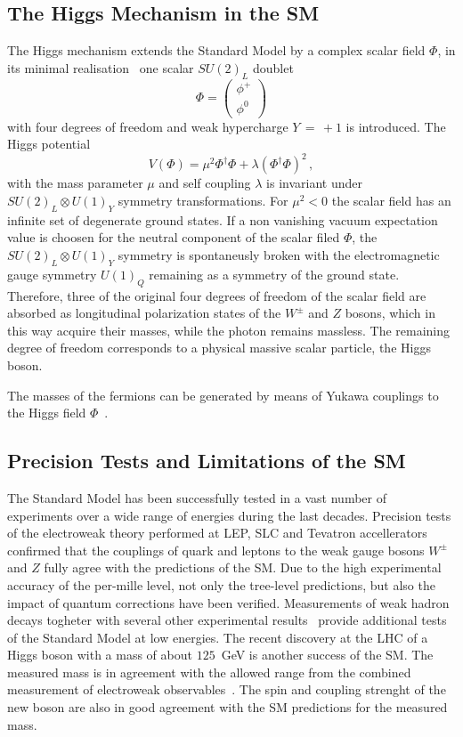 \subsection{The Higgs Mechanism in the SM}
The Higgs mechanism extends the Standard Model by a complex scalar field $\Phi$, in its minimal realisation~\cite{ENGLERT,HIGGS,HIGGS2,HIGGS3,kibble}
one scalar $SU(2)_L$ doublet 
\begin{equation}
\Phi = \begin{pmatrix} \phi^+ \\ \phi^0 \end{pmatrix} 
\end{equation}
with four degrees of freedom and weak hypercharge $Y\, = \,+1$ is introduced. The Higgs potential
\begin{equation}
V(\Phi) = \mu^2\Phi^\dagger\Phi +\lambda(\Phi^\dagger\Phi)^2 \,,
\end{equation} 
with the mass parameter $\mu$ and self coupling $\lambda$ is invariant under $SU(2)_L \otimes U(1)_Y$ symmetry transformations.
For $\mu^2 <0$  the scalar field has an infinite set of degenerate ground states.  If a non vanishing vacuum expectation value is choosen
for the neutral component of the scalar filed $\Phi$, the  $SU(2)_L \otimes U(1)_Y$ symmetry is spontaneusly broken with the electromagnetic gauge symmetry
$U(1)_Q$ remaining as a symmetry of the ground state. Therefore, three of the original four degrees of freedom 
of the scalar field are absorbed as longitudinal polarization states of the $W^{\pm}$ and $Z$ bosons, which in this way acquire their 
masses, while the photon remains massless. The remaining degree of freedom corresponds to a physical massive scalar particle, the Higgs boson.

The masses of the fermions can be generated by means of Yukawa couplings to the Higgs field $\Phi$~\cite{yukawa}.


\subsection{Precision Tests and Limitations of the SM}

The Standard Model has been successfully tested in a vast number of experiments over a wide range of energies during the last decades.
Precision tests of the electroweak theory performed at LEP, SLC and Tevatron accellerators~\cite{smtest}  
confirmed that the couplings of quark and leptons to the weak gauge bosons $W^{\pm}$  and $Z$ fully agree 
with the predictions of the SM. Due to the high experimental accuracy of the per-mille level, not only the tree-level
predictions, but also the impact of quantum corrections have been verified. 
Measurements of weak hadron decays togheter with several other experimental results~\cite{pdg}
provide additional tests of the Standard Model at low energies. 
The recent discovery at the LHC of a Higgs boson   with a mass of about $125$~GeV \cite{AHiggsO,CHiggsO} 
is another success of the SM. The measured mass is in agreement with the allowed range from the combined measurement 
of electroweak observables~\cite{gfitter}. The spin and coupling strenght of the new boson are also 
in good agreement with the SM predictions for the measured mass.

